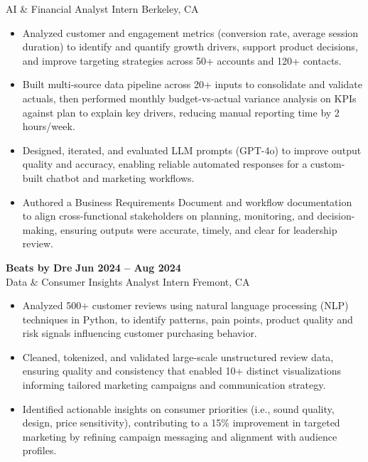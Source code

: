 \documentclass[a4paper,10pt]{article}
\renewcommand{\$}{{\fontencoding{OT1}\selectfont\char36}}
\begin{document}
AI \& Financial Analyst Intern \hfill Berkeley, CA
\begin{itemize}
\item Analyzed customer and engagement metrics (conversion rate, average session duration) to identify and quantify growth drivers, support product decisions, and improve targeting strategies across 50+ accounts and 120+ contacts.
\item {} Built multi-source data pipeline across 20+ inputs to consolidate and validate actuals, then performed monthly budget-vs-actual variance analysis on KPIs against plan to explain key drivers, reducing manual reporting time by 2 hours/week.
\item Designed, iterated, and evaluated LLM prompts (GPT-4o) to improve output quality and accuracy, enabling reliable automated responses for a custom-built chatbot and marketing workflows.
\item Authored a Business Requirements Document and workflow documentation to align cross-functional stakeholders on planning, monitoring, and decision-making, ensuring outputs were accurate, timely, and clear for leadership review.
\end{itemize}
\vspace{3pt}
\textbf{Beats by Dre} \hfill \textbf{Jun 2024 -- Aug 2024}\\
Data \& Consumer Insights Analyst Intern \hfill Fremont, CA
\begin{itemize}
\item Analyzed 500+ customer reviews using natural language processing (NLP) techniques in Python, to identify patterns, pain points, product quality and risk signals influencing customer purchasing behavior.
\item Cleaned, tokenized, and validated large-scale unstructured review data, ensuring quality and consistency that enabled 10+ distinct visualizations informing tailored marketing campaigns and communication strategy.
\item Identified actionable insights on consumer priorities (i.e., sound quality, design, price sensitivity), contributing to a {15\% improvement in targeted marketing} by refining campaign messaging and alignment with audience profiles.
\end{itemize}
\end{document}
